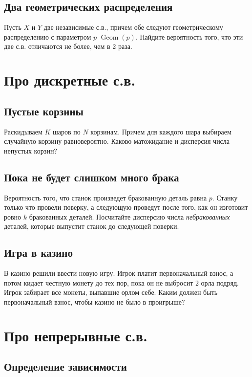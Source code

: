 \documentclass[12pt]{article}
\DeclareMathOperator{\Geom}{Geom}
\begin{document}
\subsection{Два геометрических распределения}

Пусть $X$ и $Y$ две независимые с.в., причем обе следуют геометрическому распределению с параметром $p$ $\Geom(p)$. Найдите вероятность того, что эти две с.в. отличаются не более, чем в 2 раза.

\section{Про дискретные с.в.}

\subsection{Пустые корзины}

Раскидываем $K$ шаров по $N$ корзинам. Причем для каждого шара выбираем случайную корзину равновероятно. Каково матожидание и дисперсия числа непустых корзин?

\subsection{Пока не будет слишком много брака}

Вероятность того, что станок произведет бракованную деталь равна $p$. Станку только что провели поверку, а следующую проведут после того, как он изготовит ровно $k$ бракованных деталей. Посчитайте дисперсию числа \emph{небракованных} деталей, которые выпустит станок до следующей поверки.

\subsection{Игра в казино}

В казино решили ввести новую игру. Игрок платит первоначальный взнос, а потом кидает честную монету до тех пор, пока он не выбросит 2 орла подряд. Игрок забирает все монеты, выпавшие орлом себе. Каким должен быть первоначальный взнос, чтобы казино не было в проигрыше?

\section{Про непрерывные с.в.}

\subsection{Определение зависимости}
\end{document}
